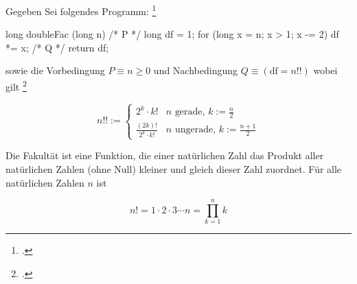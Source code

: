 \documentclass{bschlangaul-aufgabe}
\begin{document}

\let\wp=\bWpKalkuelOhneMathe

Gegeben Sei folgendes Programm:
\footcite[Thema 2 Teilaufgabe 2 Aufgabe 3]{examen:66116:2015:09}

\begin{liJavaAngabe}
long doubleFac (long n) {
  /* P */ long df = 1;
  for (long x = n; x > 1; x -= 2) {
    df *= x;
  } /* Q */
  return df;
}
\end{liJavaAngabe}

\noindent
sowie die Vorbedingung $P \equiv n \geq 0$ und Nachbedingung $Q \equiv
(\text{df} = n!!)$ wobei gilt
\footcite{sosy:ab:8}

\begin{equation*}
n!! :=
\begin{cases}
2^k \cdot k! & n\text{ gerade, }k := \frac{n}{2} \\
\frac{(2k)!}{2^k \cdot k!}& n\text{ ungerade, }k := \frac{n+1}{2}
\end{cases}
\end{equation*}

%

\begin{liExkurs}[Fakultät]
Die Fakultät ist eine Funktion, die einer natürlichen Zahl
das Produkt aller natürlichen Zahlen (ohne Null) kleiner und gleich
dieser Zahl zuordnet.
%
Für alle natürlichen Zahlen $n$ ist

\begin{displaymath}
 n! = 1 \cdot 2 \cdot 3 \dotsm n=\prod_{k=1}^{n}k
\end{displaymath}

\end{liExkurs}

%
\end{document}
